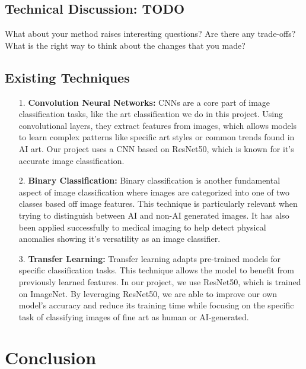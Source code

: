 \subsection{Technical Discussion: TODO}

What about your method raises interesting questions? Are there any trade-offs? What is the right way to think about the changes that you made?

\subsection{Existing Techniques}
\begin{itemize}
    \item[1.] \textbf{Convolution Neural Networks: }CNNs are a core part of image classification tasks, like the art classification we do in this project. Using convolutional layers, they extract features from images, which allows models to learn complex patterns like specific art styles or common trends found in AI art. Our project uses a CNN based on ResNet50, which is known for it's accurate image classification.
    \item[2.] \textbf{Binary Classification: } Binary classification is another fundamental aspect of image classification where images are categorized into one of two classes based off image features. This technique is particularly relevant when trying to distinguish between AI and non-AI generated images. It has also been applied successfully to medical imaging to help detect physical anomalies showing it's versatility as an image classifier.
    \item[3.] \textbf{Transfer Learning: }Transfer learning adapts pre-trained models for specific classification tasks. This technique allows the model to benefit from previously learned features. In our project, we use ResNet50, which is trained on ImageNet. By leveraging ResNet50, we are able to improve our own model's accuracy and reduce its training time while focusing on the specific task of classifying images of fine art as human or AI-generated.
\end{itemize}


\section{Conclusion}

